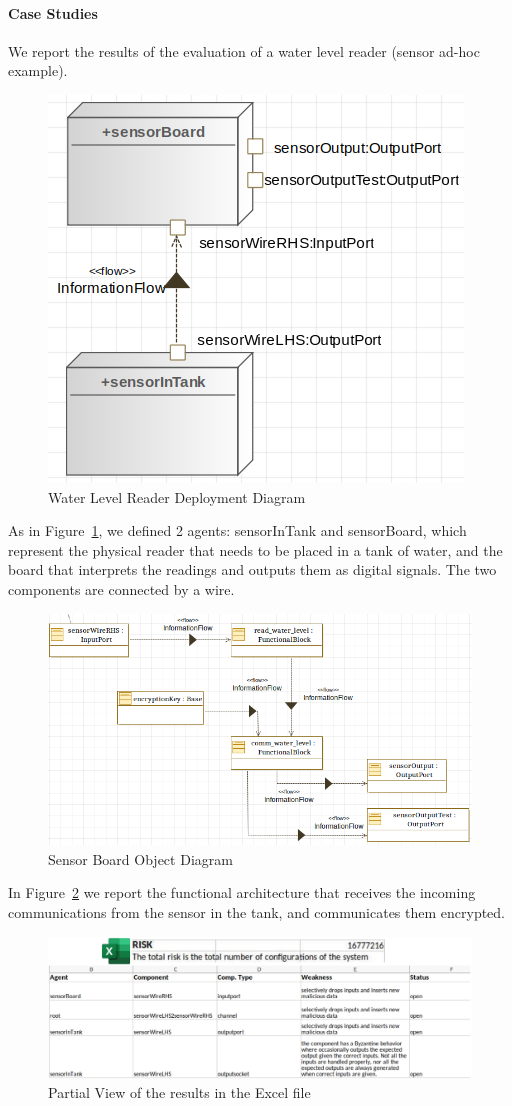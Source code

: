 \documentclass[conference]{IEEEtran}
\begin{document}
\paragraph{Case Studies}
We report the results of the evaluation of a water level reader (sensor ad-hoc example). 
\begin{figure}
	\centering
	\includegraphics[width=.7\columnwidth]{eng_cs1.png}
	\caption{Water Level Reader Deployment Diagram}
	\label{fig:eng_cs1}
\end{figure}
As in Figure~\ref{fig:eng_cs1}, we defined 2 agents: sensorInTank and sensorBoard,
which represent the physical reader that needs to be placed in a tank of water, and 
the board that interprets the readings and outputs them as digital signals.
The two components are connected by a wire.
\begin{figure}
	\centering
	\includegraphics[width=.7\textwidth]{internal_cs1.png}
	\caption{Sensor Board Object Diagram}
	\label{fig:int_cs1}
\end{figure}
In Figure~\ref{fig:int_cs1} we report the functional architecture that
receives the incoming communications from the sensor in the tank, and 
communicates them encrypted.
\begin{figure}
	\centering
	\includegraphics[width=\textwidth]{results_excel.pdf}
	\caption{Partial View of the results in the Excel file}
	\label{fig:results}
\end{figure}
\end{document}
